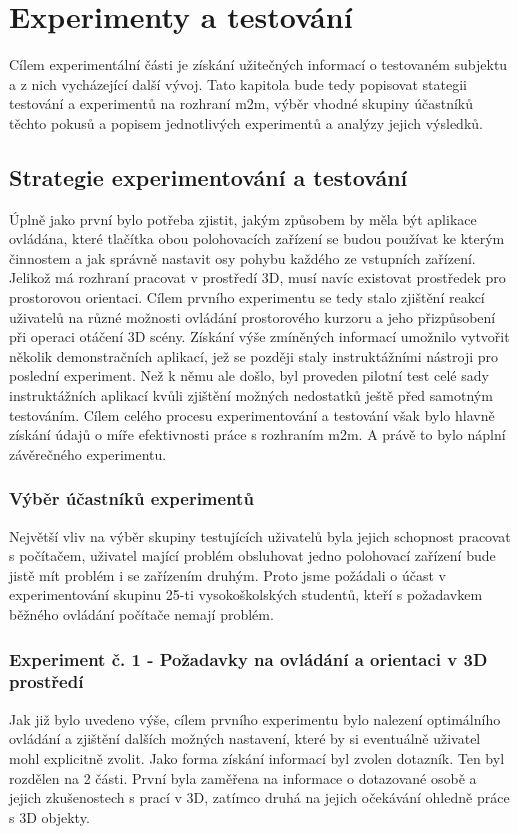 
\section{Experimenty a testování}
Cílem experimentální části je získání užitečných informací o testovaném subjektu a z nich vycházející další vývoj. Tato kapitola bude tedy popisovat stategii testování a experimentů na rozhraní m2m, výběr vhodné skupiny účastníků těchto pokusů a popisem jednotlivých experimentů a analýzy jejich výsledků.

\subsection{Strategie experimentování a testování}
Úplně jako první bylo potřeba zjistit, jakým způsobem by měla být aplikace ovládána, které tlačítka obou polohovacích zařízení se budou používat ke kterým činnostem a jak správně nastavit osy pohybu každého ze vstupních zařízení. Jelikož má rozhraní pracovat v prostředí 3D, musí navíc existovat prostředek pro prostorovou orientaci. Cílem prvního experimentu se tedy stalo zjištění reakcí uživatelů na různé možnosti ovládání prostorového kurzoru a jeho přizpůsobení při operaci otáčení 3D scény. Získání výše zmíněných informací umožnilo vytvořit několik demonstračních aplikací, jež se později staly instruktážními nástroji pro poslední experiment. Než k němu ale došlo, byl proveden pilotní test celé sady instruktážních aplikací kvůli zjištění možných nedostatků ještě před samotným testováním. Cílem celého procesu experimentování a testování však bylo hlavně získání údajů o míře efektivnosti práce s rozhraním m2m. A právě to bylo náplní závěrečného experimentu. 

\subsubsection{Výběr účastníků experimentů}
Největší vliv na výběr skupiny testujících uživatelů byla jejich schopnost pracovat s počítačem, uživatel mající problém obsluhovat jedno polohovací zařízení bude jistě mít problém i se zařízením druhým. Proto jsme požádali o účast v experimentování skupinu 25-ti vysokoškolských studentů, kteří s požadavkem běžného ovládání počítače nemají problém.

\subsubsection{Experiment č. 1 - Požadavky na ovládání a orientaci v 3D prostředí}
Jak již bylo uvedeno výše, cílem prvního experimentu bylo nalezení optimálního ovládání a zjištění dalších možných nastavení, které by si eventuálně uživatel mohl explicitně zvolit. Jako forma získání informací byl zvolen dotazník. Ten byl rozdělen na 2 části. První byla zaměřena na informace o dotazované osobě a jejich zkušenostech s prací v 3D, zatímco druhá na jejich očekávání ohledně práce s 3D objekty.

